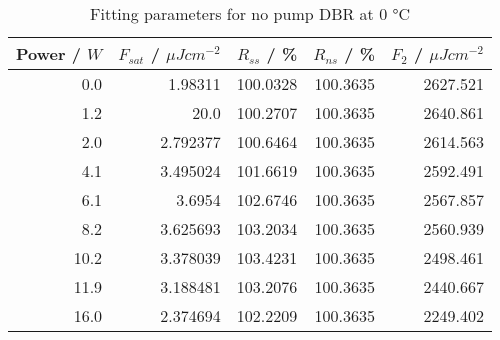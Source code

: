 \begin{table}[H]
\caption{Fitting parameters for no pump DBR at $0$ °C}
\begin{tabular}{rrrrr}
\toprule
Power / $W$ & $F_{sat}$ / $\mu Jcm^{-2}$ & $R_{ss}$ / \% & $R_{ns}$ / \% & $F_2$ / $\mu Jcm^{-2}$ \\
\midrule
0.0 & 1.98311 & 100.0328 & 100.3635 & 2627.521 \\
1.2 & 20.0 & 100.2707 & 100.3635 & 2640.861 \\
2.0 & 2.792377 & 100.6464 & 100.3635 & 2614.563 \\
4.1 & 3.495024 & 101.6619 & 100.3635 & 2592.491 \\
6.1 & 3.6954 & 102.6746 & 100.3635 & 2567.857 \\
8.2 & 3.625693 & 103.2034 & 100.3635 & 2560.939 \\
10.2 & 3.378039 & 103.4231 & 100.3635 & 2498.461 \\
11.9 & 3.188481 & 103.2076 & 100.3635 & 2440.667 \\
16.0 & 2.374694 & 102.2209 & 100.3635 & 2249.402 \\
\bottomrule
\end{tabular}
\end{table}
